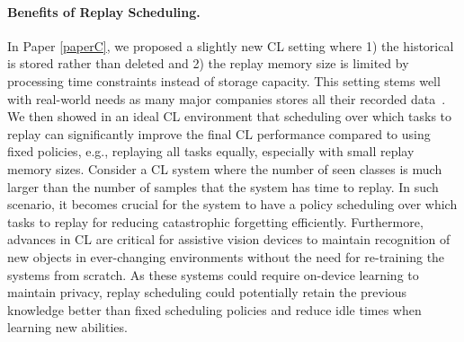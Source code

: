 \paragraph{Benefits of Replay Scheduling.} In Paper \ref{paperC}, we proposed a slightly new CL setting where 1) the historical is stored rather than deleted and 2) the replay memory size is limited by processing time constraints instead of storage capacity. This setting stems well with real-world needs as many major companies stores all their recorded data~\cite{bronson2015open,asta2016observability,bailis2017macrobase}. We then showed in an ideal CL environment that scheduling over which tasks to replay can significantly improve the final CL performance compared to using fixed policies, e.g., replaying all tasks equally, especially with small replay memory sizes. Consider a CL system where the number of seen classes is much larger than the number of samples that the system has time to replay. In such scenario, it becomes crucial for the system to have a policy scheduling over which tasks to replay for reducing catastrophic forgetting efficiently. Furthermore, advances in CL are critical for assistive vision devices to maintain recognition of new objects in ever-changing environments without the need for re-training the systems from scratch. As these systems could require on-device learning to maintain privacy, replay scheduling could potentially retain the previous knowledge better than fixed scheduling policies and reduce idle times when learning new abilities. 





